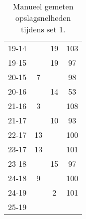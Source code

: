 \begin{table}[h!]
\begin{tabular}{|c|c|c|c|}
    19-14 & & 19 & 103 \\
    19-15 & & 19 & 97 \\
    20-15 & 7 & & 98 \\
    20-16 & & 14 & 53 \\
    21-16 & 3 & & 108 \\
    21-17 & & 10 & 93 \\
    22-17 & 13 & & 100 \\
    23-17 & 13 & & 101 \\
    23-18 & & 15 & 97 \\
    24-18 & 9 & & 100 \\
    24-19 & & 2 & 101 \\
    25-19 & & & \\ \hline
  \end{tabular}
  \caption[Manueel gemeten opslagsnelheden tijdens set 1]{\label{tab:PL1ServeMan1}Manueel gemeten opslagsnelheden tijdens set 1.}
\end{table}

